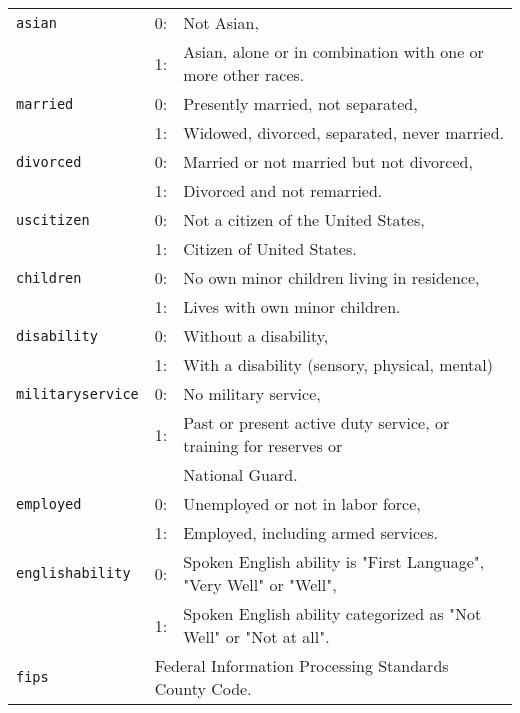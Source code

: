 \begin{tabular}{lll}
\texttt{asian} & 0: & Not Asian,\\
               & 1: & Asian, alone or in combination with one or more other races.\\
\texttt{married} & 0: & Presently married, not separated,\\
                         & 1: & Widowed, divorced, separated, never married.\\
\texttt{divorced} & 0: & Married or not married but not divorced,\\
                         & 1: & Divorced and not remarried.\\
\texttt{uscitizen} & 0: & Not a citizen of the United States,\\
                   & 1: & Citizen of United States.\\
\texttt{children} & 0: & No own minor children living in residence,\\
                         & 1: & Lives with own minor children.\\     
\texttt{disability} & 0: & Without a disability,\\
                         & 1:& With a disability (sensory, physical, mental)\\
\texttt{militaryservice} & 0: & No military service,\\
                         & 1: & Past or present active duty service, or training for reserves or \\ && National Guard. \\
\texttt{employed} & 0: & Unemployed or not in labor force,\\
                         & 1: & Employed, including armed services.\\
\texttt{englishability} & 0: & Spoken English ability is "First Language", "Very Well" or "Well",\\
                         & 1: & Spoken English ability categorized as "Not Well" or "Not at all".\\
\texttt{fips} & \multicolumn{2}{l}{Federal Information Processing Standards County Code.} \\
\end{tabular}
